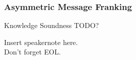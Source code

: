 \begin{frame}
	\frametitle{Asymmetric Message Franking}
	\begin{alertblock}{Knowledge Soundness}
		TODO?
	\end{alertblock}

	\begin{speakernote}
		Insert speakernote here.\\
		Don't forget EOL.
	\end{speakernote}
\end{frame}

